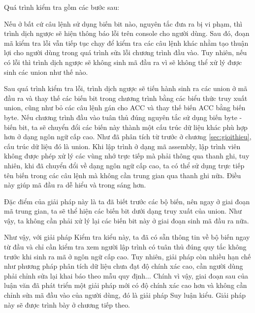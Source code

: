 Quá trình kiểm tra gồm các bước sau:

Nếu ở bất cứ câu lệnh sử dụng biến bit nào, nguyên tắc đưa ra bị vi phạm, thì trình dịch ngược sẽ hiện thông báo lỗi trên console cho người dùng. Sau đó, đoạn mã kiểm tra lỗi vẫn tiếp tục chạy để kiểm tra các câu lệnh khác nhằm tạo thuận lợi cho người dùng trong quá trình sửa lỗi chương trình đầu vào. Tuy nhiên, nếu có lỗi thì trình dịch ngược sẽ không sinh mã đầu ra vì sẽ không thể xử lý được sinh các union như thế nào.


Sau quá trình kiểm tra lỗi, trình dịch ngược sẽ tiến hành sinh ra các union ở mã đầu ra và thay thế các biến bit trong chương trình bằng các biểu thức truy xuất union, cũng như bỏ các câu lệnh gán cho ACC và thay thế biến ACC bằng biến byte. Nếu chương trình đầu vào tuân thủ đúng nguyên tắc sử dụng biến byte - biến bit, ta sẽ chuyển đổi các biến này thành một cấu trúc dữ liệu khác phù hợp hơn ở dạng ngôn ngữ cấp cao. Như đã phân tích từ trước ở chương \ref{sec:gioithieu}, cấu trúc dữ liệu đó là union.
Khi lập trình ở dạng mã assembly, lập trình viên không được phép xử lý các vùng nhớ trực tiếp mà phải thông qua thanh ghi, tuy nhiên, khi đã chuyển đổi về dạng ngôn ngữ cấp cao, ta có thể sử dụng trực tiếp tên biến trong các câu lệnh mà không cần trung gian qua thanh ghi nữa. Điều này giúp mã đầu ra dễ hiểu và trong sáng hơn.


Đặc điểm của giải pháp này là ta đã biết trước các bộ biến, nên ngay ở giai đoạn mã trung gian, ta sẽ thể hiện các biến bit dưới dạng truy xuất của union. Như vậy, ta không cần phải xử lý lại các biến bit này ở giai đoạn sinh mã đầu ra nữa.

Như vậy, với giải pháp Kiểm tra kiểu này, ta đã có sẵn thông tin về bộ biến ngay từ đầu và chỉ cần kiểm tra xem người lập trình có tuân thủ đúng quy tắc không trước khi sinh ra mã ở ngôn ngữ cấp cao. Tuy nhiên, giải pháp còn nhiều hạn chế như phương pháp phân tích dữ liệu chưa đạt độ chính xác cao, cần người dùng phải chỉnh sửa lại khai báo theo mẫu quy định... Chính vì vậy, giai đoạn sau của luận văn đã phát triển một giải pháp mới có độ chính xác cao hơn và không cần chỉnh sửa mã đầu vào của người dùng, đó là giải pháp Suy luận kiểu. Giải pháp này sẽ được trình bày ở chương tiếp theo.



